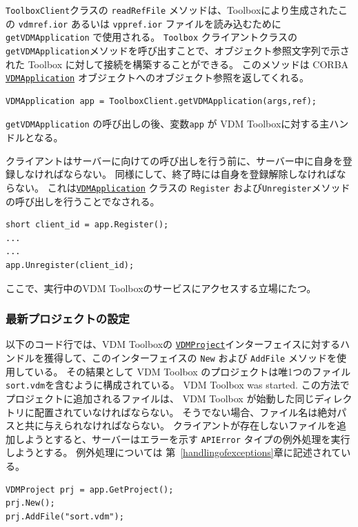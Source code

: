 \documentclass[\pformat,12pt]{jarticle}
\newcommand{\VDMApplication}{\hyperlink{interface.VDMApplication}{VDMApplication}}
\newcommand{\VDMProject}{\hyperlink{interface.VDMProject}{VDMProject}}
\begin{document}
{\tt ToolboxClient}クラスの {\tt readRefFile} メソッドは、Toolboxにより生成されたこの \texttt{vdmref.ior} あるいは \texttt{vppref.ior} ファイルを読み込むために{\tt getVDMApplication} で使用される。
 {\tt Toolbox} クライアントクラスの{\tt getVDMApplication}メソッドを呼び出すことで、オブジェクト参照文字列で示された Toolbox に対して接続を構築することができる。
このメソッドは CORBA {\tt \VDMApplication} オブジェクトへのオブジェクト参照を返してくれる。

\begin{verbatim}
VDMApplication app = ToolboxClient.getVDMApplication(args,ref);
\end{verbatim}

{\tt getVDMApplication} の呼び出しの後、変数{\tt app} が VDM Toolboxに対する主ハンドルとなる。

クライアントはサーバーに向けての呼び出しを行う前に、サーバー中に自身を登録しなければならない。
同様にして、終了時には自身を登録解除しなければならない。
これは{\tt \VDMApplication} クラスの  {\tt Register} および{\tt Unregister}メソッドの呼び出しを行うことでなされる。

\begin{verbatim}
short client_id = app.Register();
...
...
app.Unregister(client_id);
\end{verbatim}

ここで、実行中のVDM Toolboxのサービスにアクセスする立場にたつ。

\subsubsection{最新プロジェクトの設定}

以下のコード行では、VDM Toolboxの {\tt \VDMProject}インターフェイスに対するハンドルを獲得して、このインターフェイスの {\tt New} および {\tt AddFile} メソッドを使用している。
その結果として VDM Toolbox のプロジェクトは唯1つのファイル {\tt sort.vdm}を含むように構成されている。
VDM Toolbox was started. 
この方法でプロジェクトに追加されるファイルは、 VDM Toolbox が始動した同じディレクトリに配置されていなければならない。
そうでない場合、ファイル名は絶対パスと共に与えられなければならない。
クライアントが存在しないファイルを追加しようとすると、サーバーはエラーを示す {\tt APIError} タイプの例外処理を実行しようとする。
例外処理については 第~\ref{handlingofexceptions}章に記述されている。

\begin{verbatim}
VDMProject prj = app.GetProject();
prj.New();
prj.AddFile("sort.vdm");
\end{verbatim}
\end{document}
